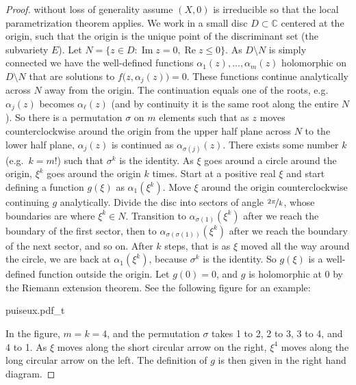 \documentclass[12pt,openany]{book}
\renewcommand{\Re}{\operatorname{Re}}
\renewcommand{\Im}{\operatorname{Im}}
\newcommand{\C}{{\mathbb{C}}}
\theoremstyle{plain}
\theoremstyle{remark}
\theoremstyle{definition}
\theoremstyle{exercise}
\theoremstyle{example}
\begin{document}
\begin{proof}
without loss of generality
assume $(X,0)$
is irreducible so that
the local parametrization theorem applies.
We work in a small disc $D \subset \C$ centered at the origin, such that the
origin is the unique point of the discriminant set (the subvariety
$E$).  Let $N = \{ z \in D : \Im z = 0 , \Re z \leq 0 \}$.
As $D \setminus N$ is simply connected we have the well-defined functions
$\alpha_1(z),\ldots,\alpha_m(z)$ holomorphic on $D \setminus N$
that are solutions to $f\bigl(z,\alpha_j(z)\bigr) = 0$.
These functions continue analytically across $N$ away from the
origin.  The continuation equals one of the roots, e.g.\ $\alpha_j(z)$
becomes $\alpha_\ell(z)$ (and by continuity it is the
same root along the entire $N$).  So there is
a permutation $\sigma$ on $m$ elements such that as $z$ moves
counterclockwise around the origin from the upper half plane across $N$ to the lower half
plane, $\alpha_j(z)$ is continued as $\alpha_{\sigma(j)}(z)$.
There exists some number $k$ (e.g.\ $k=m!$) such that $\sigma^k$ is the identity.
As $\xi$ goes around
a circle around the origin, $\xi^k$ goes around the origin $k$ times.
Start at a positive real $\xi$ and start defining a
function $g(\xi)$ as
$\alpha_1(\xi^k)$.
Move $\xi$ around the origin counterclockwise continuing $g$ analytically.
Divide the disc into sectors of angle $\nicefrac{2\pi}{k}$,
whose boundaries are where $\xi^k \in N$.
Transition to $\alpha_{\sigma(1)}(\xi^k)$ after we reach the boundary
of the first sector, then to
$\alpha_{\sigma(\sigma(1))}(\xi^k)$ after we reach the boundary of the next sector, and so on.
After $k$ steps, that is as
$\xi$ moved all the way around the circle,
we are back at $\alpha_1(\xi^k)$,
because
$\sigma^k$ is the identity.
So $g(\xi)$ is a well-defined function outside the origin.  Let
$g(0) = 0$, and $g$ is holomorphic at 0 by the Riemann extension theorem.
See the following figure for an example:
\begin{center}
{puiseux.pdf_t}
\end{center}
In the figure, $m = k = 4$, and the permutation $\sigma$ takes 1 to 2, 2 to 3, 3 to 4,
and 4 to 1.  As $\xi$ moves along the short circular arrow on the right, $\xi^4$
moves along the long circular arrow on the left.  The definition of $g$ is
then given in the right hand diagram.
\end{proof}
\end{document}
